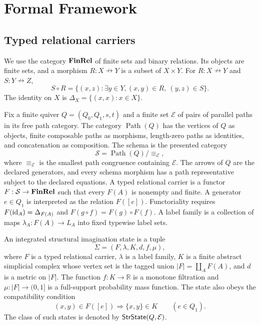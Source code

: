 \section{Formal Framework}

\subsection{Typed relational carriers}

We use the category $\mathbf{FinRel}$ of finite sets and binary relations. Its objects are
finite sets, and a morphism $R:X\nrightarrow Y$ is a subset of $X\times Y$.
For $R:X\nrightarrow Y$ and $S:Y\nrightarrow Z$,
\[
S\circ R=\{(x,z):\exists y\in Y,
(x,y)\in R,\ (y,z)\in S\}.
\]
The identity on $X$ is $\Delta_X=\{(x,x):x\in X\}$.

Fix a finite quiver $Q=(Q_0,Q_1,s,t)$ and a finite set $\mathcal E$ of
pairs of parallel paths in its free path category. The category
$\operatorname{Path}(Q)$ has the vertices of $Q$ as objects, finite composable
paths as morphisms, length-zero paths as identities, and concatenation as
composition. The schema is the presented
category
\[
\mathcal S=\operatorname{Path}(Q)/\!\equiv_{\mathcal E},
\]
where $\equiv_{\mathcal E}$ is the smallest path congruence containing
$\mathcal E$. The arrows of $Q$ are the declared generators, and every schema
morphism has a path representative subject to the declared equations. A typed
relational carrier is a functor $F:\mathcal S\to\mathbf{FinRel}$ such that every
$F(A)$ is nonempty and finite. A generator $e\in Q_1$ is interpreted as the
relation $F([e])$. Functoriality requires
$F(\mathrm{id}_A)=\Delta_{F(A)}$ and $F(g\circ f)=F(g)\circ F(f)$.
A label family is a collection of maps
$\lambda_A:F(A)\to L_A$ into fixed typewise label sets.

\begin{definition}
An integrated structural imagination state is a tuple
\[
\Sigma=(F,\lambda,K,d,f,\mu),
\]
where $F$ is a typed relational carrier, $\lambda$ is a label family,
$K$ is a finite abstract simplicial complex whose vertex set is the tagged union
$|F|=\coprod_A F(A)$, and $d$ is a metric on $|F|$. The function
$f:K\to\mathbb R$ is a monotone filtration and
$\mu:|F|\to(0,1]$ is a full-support probability mass function. The state also
obeys the compatibility condition
\[
(x,y)\in F([e])\Longrightarrow\{x,y\}\in K\qquad(e\in Q_1).
\]
The class of such states is denoted by $\mathsf{StrState}(Q,\mathcal E)$.
\end{definition}

